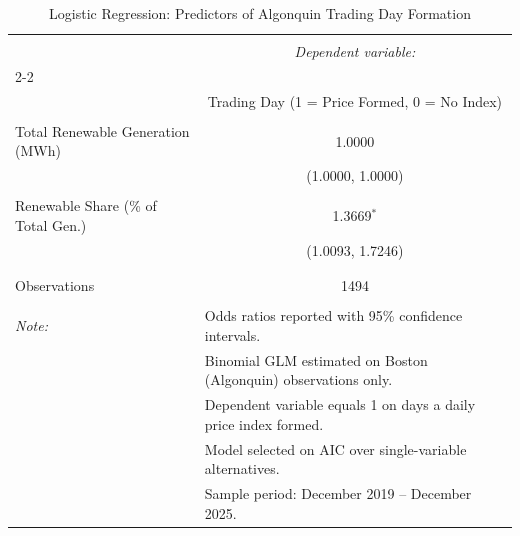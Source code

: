 
\begin{table}[!htbp] \centering 
  \caption{Logistic Regression: Predictors of Algonquin Trading Day Formation} 
  \label{tab:tradeday} 
\small 
\begin{tabular}{@{\extracolsep{5pt}}lc} 
\\[-1.8ex]\hline 
\hline \\[-1.8ex] 
 & \multicolumn{1}{c}{\textit{Dependent variable:}} \\ 
\cline{2-2} 
\\[-1.8ex] & Trading Day (1 = Price Formed, 0 = No Index) \\ 
\hline \\[-1.8ex] 
 Total Renewable Generation (MWh) & 1.0000 \\ 
  & (1.0000, 1.0000) \\ 
  & \\ 
 Renewable Share (\% of Total Gen.) & 1.3669$^{*}$ \\ 
  & (1.0093, 1.7246) \\ 
  & \\ 
\hline \\[-1.8ex] 
Observations & 1494 \\ 
\hline 
\hline \\[-1.8ex] 
\textit{Note:}  & \multicolumn{1}{l}{Odds ratios reported with 95\% confidence intervals.} \\ 
 & \multicolumn{1}{l}{Binomial GLM estimated on Boston (Algonquin) observations only.} \\ 
 & \multicolumn{1}{l}{Dependent variable equals 1 on days a daily price index formed.} \\ 
 & \multicolumn{1}{l}{Model selected on AIC over single-variable alternatives.} \\ 
 & \multicolumn{1}{l}{Sample period: December 2019 -- December 2025.} \\ 
\end{tabular} 
\end{table} 
